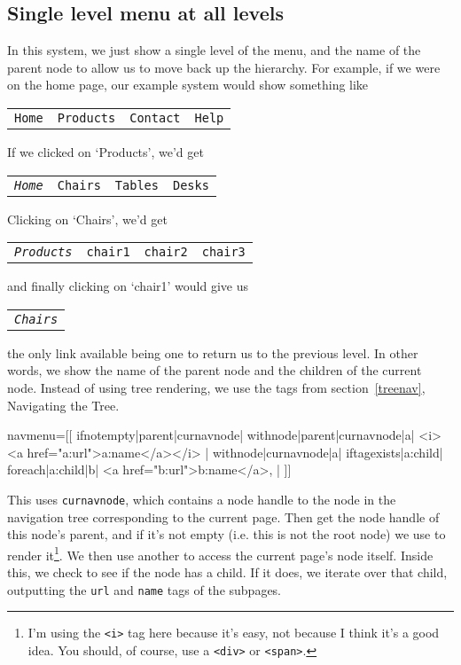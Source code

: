 \subsection{Single level menu at all levels}
\label{simplesingle}
In this system, we just show a single level of the menu, and the name of the
parent node to allow us to move back up the hierarchy. For example, if we were
on the home page, our example system would show something like
\begin{center}
\begin{tabular}{llll}
\texttt{Home} & \texttt{Products} & \texttt{Contact} & \texttt{Help} \\ 
\end{tabular}
\end{center}
If we clicked on `Products', we'd get
\begin{center}
\begin{tabular}{llll}
\texttt{\emph{Home}} & \texttt{Chairs} & \texttt{Tables} & \texttt{Desks} \\
\end{tabular}
\end{center}
Clicking on `Chairs', we'd get 
\begin{center}
\begin{tabular}{llll}
\texttt{\emph{Products}} & \texttt{chair1} & \texttt{chair2} & \texttt{chair3} \\
\end{tabular}
\end{center}
and finally clicking on `chair1' would give us
\begin{center}
\begin{tabular}{l}
\texttt{\emph{Chairs}}
\end{tabular}
\end{center}
the only link available being one to return us to the previous level. In other
words, we show the name of the parent node and the children of the current
node. Instead of using tree rendering, we use the tags from section~\ref{treenav}, Navigating the Tree.
\begin{MyVerbatim}
navmenu=[[
    {{ifnotempty|{{parent|{{curnavnode}}}}|
        {{withnode|{{parent|{{curnavnode}}}}|a|
            <i><a href="{{a:url}}">{{a:name}}</a></i>}}
        |}}
    {{withnode|{{curnavnode}}|a|
        {{iftagexists|a:child|
            {{foreach|{{a:child}}|b|
                <a href="{{b:url}}">{{b:name}}</a>,
            }}
        |}}
    }}
]]
\end{MyVerbatim}
This uses \texttt{curnavnode}, which contains a node handle to the node in the navigation tree
corresponding to the current page. Then get the node handle of this node's parent, and if it's
not empty (i.e. this is not the root node) we use  to render it\footnote{I'm using
the \texttt{<i>} tag here because it's easy, not because I think it's a good idea. You should, of course,
use a \texttt{<div>} or \texttt{<span>}.}.
We then use another  to access the current page's node itself. Inside this, we check to see if the 
node has a child. If it does, we iterate over that child, outputting the \texttt{url} and \texttt{name}
tags of the subpages.

